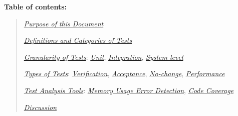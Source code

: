 \documentclass[]{article}
\date{}
\begin{document}
\pagestyle{fancy}
\renewcommand{\headrulewidth}{0pt}
  
\thispagestyle{empty}
\textbf{\newline}
\textbf{\newline}

\textbf{Table of contents:}

\begin{quote}
\protect\hyperlink{purpose-of-this-document}{\emph{Purpose of this
Document}}

\protect\hyperlink{definitions-and-categories-of-tests}{\emph{Definitions
and Categories of Tests}}

\protect\hyperlink{granularity-of-tests}{\emph{Granularity of Tests}}:
\protect\hyperlink{id.5saje75168fl}{\emph{Unit}},
\protect\hyperlink{id.j931ebv6xsmb}{\emph{Integration}},
\protect\hyperlink{id.vllu2z1lvhtb}{\emph{System-level}}

\protect\hyperlink{types-of-tests}{\emph{Types of Tests}}:
\protect\hyperlink{id.ew32p2pvdumb}{\emph{Verification}},
\protect\hyperlink{id.vshb6z6grels}{\emph{Acceptance}},
\protect\hyperlink{id.h6jkn7ujujea}{\emph{No-change}},
\protect\hyperlink{id.aq6w7wcjeigv}{\emph{Performance}}

\protect\hyperlink{test-analysis-tools}{\emph{Test Analysis Tools}}:
\protect\hyperlink{id.6n6lrjjln67m}{\emph{Memory Usage Error
Detection}}, \protect\hyperlink{id.sxuj9tgusjrf}{\emph{Code Coverage}}

\protect\hyperlink{discussion}{\emph{Discussion}}
\end{quote}
\end{document}
